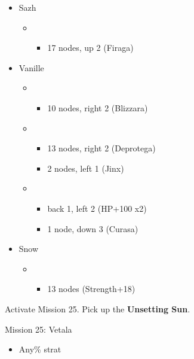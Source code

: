 \begin{menu}
	\begin{itemize}
		\crystarium
		\begin{itemize}
			\item Sazh
				\begin{itemize}
					\item \rav
						\begin{itemize}
							\item 17 nodes, up 2 (Firaga)
						\end{itemize}
				\end{itemize}
			\item Vanille
				\begin{itemize}
					\item \rav
						\begin{itemize}
							\item 10 nodes, right 2 (Blizzara)
						\end{itemize}
					\item \sab
						\begin{itemize}
							\item 13 nodes, right 2 (Deprotega)
							\item 2 nodes, left 1 (Jinx)
						\end{itemize}
					\item \med
						\begin{itemize}
							\item back 1, left 2 (HP+100 x2)
							\item 1 node, down 3 (Curasa)
						\end{itemize}
				\end{itemize}
			\item Snow
				\begin{itemize}
					\item \sen
						\begin{itemize}
							\item 13 nodes (Strength+18)
						\end{itemize}
				\end{itemize}							      	
		\end{itemize}
	\end{itemize}
\end{menu}

Activate Mission 25.
Pick up the \textbf{Unsetting Sun}.

\begin{battle}{Mission 25: Vetala}
	\begin{itemize}
		\item Any\% strat
	\end{itemize}
\end{battle}

